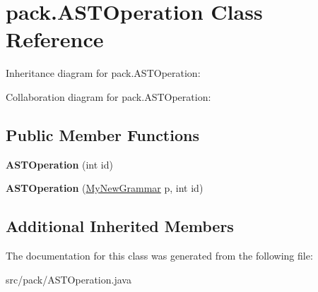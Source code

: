\hypertarget{classpack_1_1_a_s_t_operation}{}\section{pack.\+A\+S\+T\+Operation Class Reference}
\label{classpack_1_1_a_s_t_operation}


Inheritance diagram for pack.\+A\+S\+T\+Operation\+:


Collaboration diagram for pack.\+A\+S\+T\+Operation\+:
\subsection*{Public Member Functions}
\begin{DoxyCompactItemize}
\item 
{\bfseries A\+S\+T\+Operation} (int id)\hypertarget{classpack_1_1_a_s_t_operation_aca06d0387102070d8280fba9ba6e3719}{}\label{classpack_1_1_a_s_t_operation_aca06d0387102070d8280fba9ba6e3719}

\item 
{\bfseries A\+S\+T\+Operation} (\hyperlink{classpack_1_1_my_new_grammar}{My\+New\+Grammar} p, int id)\hypertarget{classpack_1_1_a_s_t_operation_abfbff1ee83ea96cbef8e85e8d42a7d64}{}\label{classpack_1_1_a_s_t_operation_abfbff1ee83ea96cbef8e85e8d42a7d64}

\end{DoxyCompactItemize}
\subsection*{Additional Inherited Members}


The documentation for this class was generated from the following file\+:\begin{DoxyCompactItemize}
\item 
src/pack/A\+S\+T\+Operation.\+java\end{DoxyCompactItemize}
